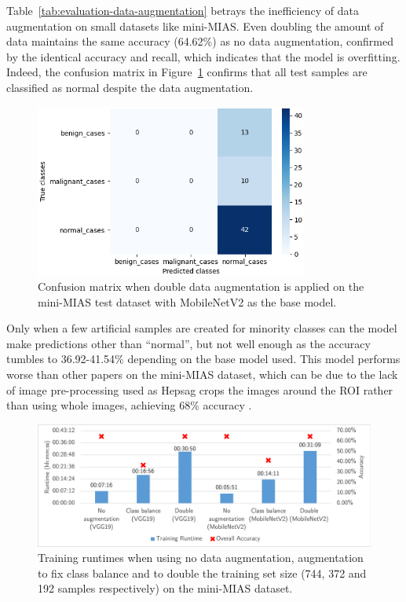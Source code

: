 

Table~\ref{tab:evaluation-data-augmentation} betrays the inefficiency of data augmentation on small datasets like mini-MIAS. Even doubling the amount of data maintains the same accuracy (64.62\%) as no data augmentation, confirmed by the identical accuracy and recall, which indicates that the model is overfitting. Indeed, the confusion matrix in Figure~\ref{fig:evaluation-data_augmentation_experiment/confusion_matrix} confirms that all test samples are classified as normal despite the data augmentation.

\begin{figure}[h]
\centerline{\includegraphics[width=0.8\textwidth]{figures/evaluation/data_augmentation_experiment/confusion_matrix_mobilenetv2_double.png}}
\caption{\label{fig:evaluation-data_augmentation_experiment/confusion_matrix}Confusion matrix when double data augmentation is applied on the mini-MIAS test dataset with MobileNetV2 as the base model.}
\end{figure}

Only when a few artificial samples are created for minority classes can the model make predictions other than ``normal'', but not well enough as the accuracy tumbles to 36.92-41.54\% depending on the base model used. This model performs worse than other papers on the mini-MIAS dataset, which can be due to the lack of image pre-processing used as Hepsag crops the images around  the ROI rather than using whole images, achieving 68\% accuracy \citep{Hepsag2017}.\\

\begin{figure}[h]
\centerline{\includegraphics[width=\textwidth]{figures/evaluation/data_augmentation_experiment/runtimes.png}}
\caption{\label{fig:evaluation-data_augmentation_experiment-runtimes.png}Training runtimes when using no data augmentation, augmentation to fix class balance and to double the training set  size (744, 372 and 192 samples respectively) on the mini-MIAS dataset.}
\end{figure}

